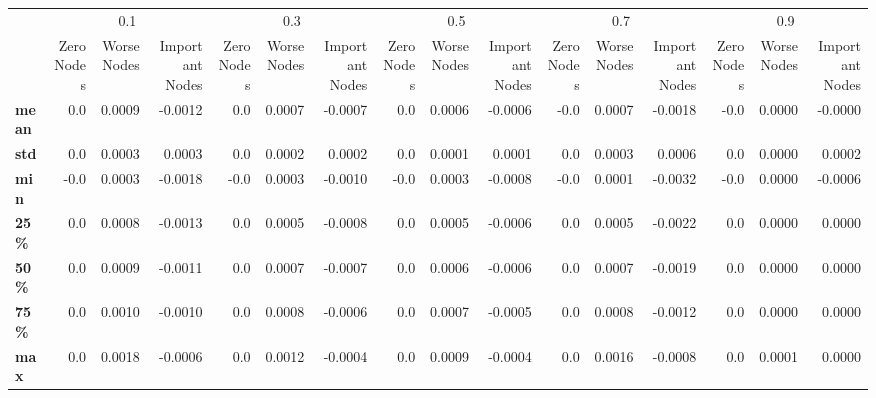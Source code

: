 \begin{tabular}{lrrrrrrrrrrrrrrr}
\toprule
{} & \multicolumn{3}{c}{0.1} & \multicolumn{3}{c}{0.3} & \multicolumn{3}{c}{0.5} & \multicolumn{3}{c}{0.7} & \multicolumn{3}{c}{0.9} \\
{} & Zero Nodes & Worse Nodes & Important Nodes & Zero Nodes & Worse Nodes & Important Nodes & Zero Nodes & Worse Nodes & Important Nodes & Zero Nodes & Worse Nodes & Important Nodes & Zero Nodes & Worse Nodes & Important Nodes \\
\midrule
\textbf{mean} &        0.0 &      0.0009 &         -0.0012 &        0.0 &      0.0007 &         -0.0007 &        0.0 &      0.0006 &         -0.0006 &       -0.0 &      0.0007 &         -0.0018 &       -0.0 &      0.0000 &         -0.0000 \\
\textbf{std } &        0.0 &      0.0003 &          0.0003 &        0.0 &      0.0002 &          0.0002 &        0.0 &      0.0001 &          0.0001 &        0.0 &      0.0003 &          0.0006 &        0.0 &      0.0000 &          0.0002 \\
\textbf{min } &       -0.0 &      0.0003 &         -0.0018 &       -0.0 &      0.0003 &         -0.0010 &       -0.0 &      0.0003 &         -0.0008 &       -0.0 &      0.0001 &         -0.0032 &       -0.0 &      0.0000 &         -0.0006 \\
\textbf{25\% } &        0.0 &      0.0008 &         -0.0013 &        0.0 &      0.0005 &         -0.0008 &        0.0 &      0.0005 &         -0.0006 &        0.0 &      0.0005 &         -0.0022 &        0.0 &      0.0000 &          0.0000 \\
\textbf{50\% } &        0.0 &      0.0009 &         -0.0011 &        0.0 &      0.0007 &         -0.0007 &        0.0 &      0.0006 &         -0.0006 &        0.0 &      0.0007 &         -0.0019 &        0.0 &      0.0000 &          0.0000 \\
\textbf{75\% } &        0.0 &      0.0010 &         -0.0010 &        0.0 &      0.0008 &         -0.0006 &        0.0 &      0.0007 &         -0.0005 &        0.0 &      0.0008 &         -0.0012 &        0.0 &      0.0000 &          0.0000 \\
\textbf{max } &        0.0 &      0.0018 &         -0.0006 &        0.0 &      0.0012 &         -0.0004 &        0.0 &      0.0009 &         -0.0004 &        0.0 &      0.0016 &         -0.0008 &        0.0 &      0.0001 &          0.0000 \\
\bottomrule
\end{tabular}
